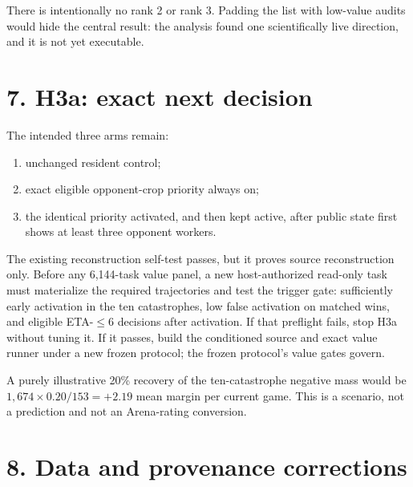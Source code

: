 \documentclass[10pt,a4paper]{article}
\begin{document}
There is intentionally no rank 2 or rank 3. Padding the list with low-value audits would
hide the central result: the analysis found one scientifically live direction, and it is
not yet executable.

\section*{7. H3a: exact next decision}

The intended three arms remain:

\begin{enumerate}
  \item unchanged resident control;
  \item exact eligible opponent-crop priority always on;
  \item the identical priority activated, and then kept active, after public state first
        shows at least three opponent workers.
\end{enumerate}

The existing reconstruction self-test passes, but it proves source reconstruction only.
Before any 6,144-task value panel, a new host-authorized read-only task must materialize the
required trajectories and test the trigger gate: sufficiently early activation in the ten
catastrophes, low false activation on matched wins, and eligible ETA-$\leq 6$ decisions after
activation. If that preflight fails, stop H3a without tuning it. If it passes, build the
conditioned source and exact value runner under a new frozen protocol; the frozen protocol's
value gates govern.

A purely illustrative 20\% recovery of the ten-catastrophe negative mass would be
$1{,}674 \times 0.20 / 153 = +2.19$ mean margin per current game. This is a scenario, not a
prediction and not an Arena-rating conversion.

\section*{8. Data and provenance corrections}
\end{document}
